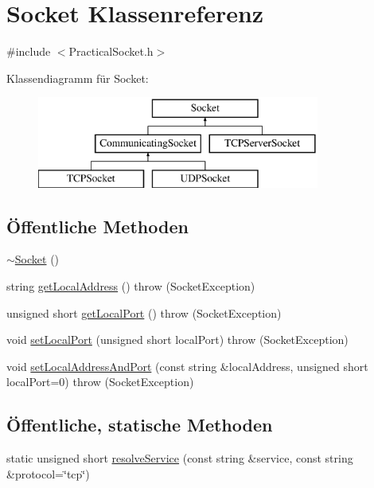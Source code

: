 \hypertarget{classSocket}{\section{Socket Klassenreferenz}
\label{classSocket}
}


{\ttfamily \#include $<$Practical\-Socket.\-h$>$}

Klassendiagramm für Socket\-:\begin{figure}[H]
\begin{center}
\leavevmode
\includegraphics[height=3.000000cm]{classSocket}
\end{center}
\end{figure}
\subsection*{Öffentliche Methoden}
\begin{DoxyCompactItemize}
\item 
\hyperlink{classSocket_aeac4eb6379a543d38ed88977d3b6630a}{$\sim$\-Socket} ()
\item 
string \hyperlink{classSocket_a0fca07bdfa97874fba1a17995ed7cda3}{get\-Local\-Address} ()  throw (\-Socket\-Exception)
\item 
unsigned short \hyperlink{classSocket_ae01143b667d69483a2f53d0f4ce7eeed}{get\-Local\-Port} ()  throw (\-Socket\-Exception)
\item 
void \hyperlink{classSocket_a773fe4a35146002de76952e16fdebcfa}{set\-Local\-Port} (unsigned short local\-Port)  throw (\-Socket\-Exception)
\item 
void \hyperlink{classSocket_aa6b986410bc2e606ba27d01fa7cb8836}{set\-Local\-Address\-And\-Port} (const string \&local\-Address, unsigned short local\-Port=0)  throw (\-Socket\-Exception)
\end{DoxyCompactItemize}
\subsection*{Öffentliche, statische Methoden}
\begin{DoxyCompactItemize}
\item 
static unsigned short \hyperlink{classSocket_a982c63b25c5b756321a74074a275adbc}{resolve\-Service} (const string \&service, const string \&protocol=\char`\"{}tcp\char`\"{})
\end{DoxyCompactItemize}
